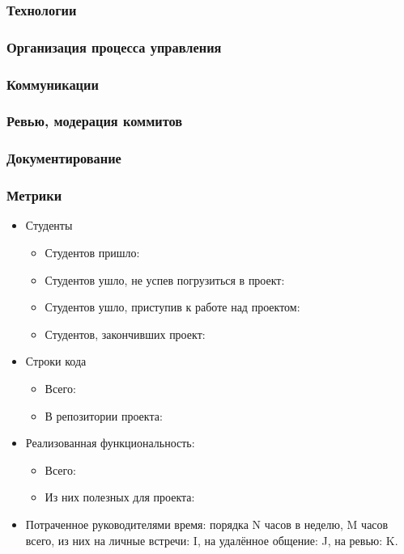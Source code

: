 \documentclass[a5paper]{article}
\begin{document}
\subsubsection{Технологии}

\subsubsection{Организация процесса управления}

\subsubsection{Коммуникации}

\subsubsection{Ревью, модерация коммитов}

\subsubsection{Документирование}

\subsubsection{Метрики}
\begin{itemize}
	\item Студенты
		\begin{itemize}
			\item Студентов пришло: 
			\item Студентов ушло, не успев погрузиться в проект:
			\item Студентов ушло, приступив к работе над проектом:
			\item Студентов, закончивших проект:
		\end{itemize}
	\item Строки кода
		\begin{itemize}
			\item Всего:
			\item В репозитории проекта:
		\end{itemize}
	\item Реализованная функциональность:
		\begin{itemize}
			\item Всего: 
			\item Из них полезных для проекта: 
		\end{itemize}
	\item Потраченное руководителями время: порядка N часов в неделю, M часов всего, из них на личные встречи: I, на удалённое общение: J, на ревью: K.
\end{itemize}
\end{document}
